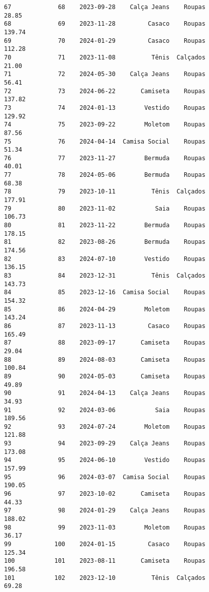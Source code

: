 \documentclass[11pt]{article}
\begin{document}
\begin{Verbatim}[commandchars=\\\{\}]
67             68    2023-09-28    Calça Jeans    Roupas           28.85   
68             69    2023-11-28         Casaco    Roupas          139.74   
69             70    2024-01-29         Casaco    Roupas          112.28   
70             71    2023-11-08          Tênis  Calçados           21.00   
71             72    2024-05-30    Calça Jeans    Roupas           56.41   
72             73    2024-06-22       Camiseta    Roupas          137.82   
73             74    2024-01-13        Vestido    Roupas          129.92   
74             75    2023-09-22        Moletom    Roupas           87.56   
75             76    2024-04-14  Camisa Social    Roupas           51.34   
76             77    2023-11-27        Bermuda    Roupas           40.01   
77             78    2024-05-06        Bermuda    Roupas           68.38   
78             79    2023-10-11          Tênis  Calçados          177.91   
79             80    2023-11-02           Saia    Roupas          106.73   
80             81    2023-11-22        Bermuda    Roupas          178.15   
81             82    2023-08-26        Bermuda    Roupas          174.56   
82             83    2024-07-10        Vestido    Roupas          136.15   
83             84    2023-12-31          Tênis  Calçados          143.73   
84             85    2023-12-16  Camisa Social    Roupas          154.32   
85             86    2024-04-29        Moletom    Roupas          143.24   
86             87    2023-11-13         Casaco    Roupas          165.49   
87             88    2023-09-17       Camiseta    Roupas           29.04   
88             89    2024-08-03       Camiseta    Roupas          100.84   
89             90    2024-05-03       Camiseta    Roupas           49.89   
90             91    2024-04-13    Calça Jeans    Roupas           34.93   
91             92    2024-03-06           Saia    Roupas          189.56   
92             93    2024-07-24        Moletom    Roupas          121.88   
93             94    2023-09-29    Calça Jeans    Roupas          173.08   
94             95    2024-06-10        Vestido    Roupas          157.99   
95             96    2024-03-07  Camisa Social    Roupas          190.05   
96             97    2023-10-02       Camiseta    Roupas           44.33   
97             98    2024-01-29    Calça Jeans    Roupas          188.02   
98             99    2023-11-03        Moletom    Roupas           36.17   
99            100    2024-01-15         Casaco    Roupas          125.34   
100           101    2023-08-11       Camiseta    Roupas          196.58   
101           102    2023-12-10          Tênis  Calçados           69.28   

\end{Verbatim}
\end{document}

